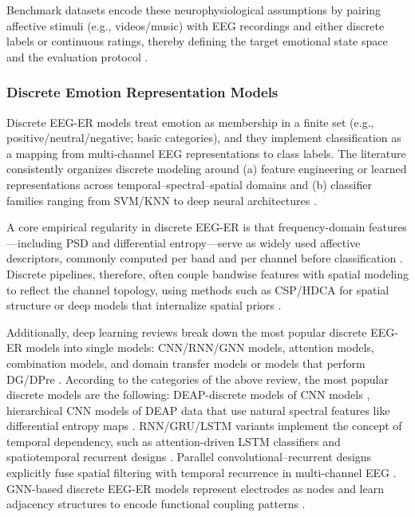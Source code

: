 \documentclass{WileyMSP-template}
\begin{document}
Benchmark datasets encode these neurophysiological assumptions by pairing affective stimuli (e.g., videos/music) with EEG recordings and either discrete labels or continuous ratings, thereby defining the target emotional state space and the evaluation protocol \cite{li2022transferreview}.

\subsubsection{Discrete Emotion Representation Models}
Discrete EEG-ER models treat emotion as membership in a finite set (e.g., positive/neutral/negative; basic categories), and they implement classification as a mapping from multi-channel EEG representations to class labels. The literature consistently organizes discrete modeling around (a) feature engineering or learned representations across temporal–spectral–spatial domains and (b) classifier families ranging from SVM/KNN to deep neural architectures \cite{wang2024researchprogress}.

A core empirical regularity in discrete EEG-ER is that frequency-domain features—including PSD and differential entropy—serve as widely used affective descriptors, commonly computed per band and per channel before classification \cite{ma2024peerjreview}. Discrete pipelines, therefore, often couple bandwise features with spatial modeling to reflect the channel topology, using methods such as CSP/HDCA for spatial structure or deep models that internalize spatial priors \cite{ma2024peerjreview}. 

Additionally, deep learning reviews break down the most popular discrete EEG-ER models into single models: CNN/RNN/GNN models, attention models, combination models, and domain transfer models or models that perform DG/DPre \cite{geng2025dlreview}. According to the categories of the above review, the most popular discrete models are the following: DEAP-discrete models of CNN models \cite{tripathi2017deapcnn}, hierarchical CNN models of DEAP data that use natural spectral features like differential entropy maps \cite{li2018hcnn}. RNN/GRU/LSTM variants implement the concept of temporal dependency, such as attention-driven LSTM classifiers and spatiotemporal recurrent designs \cite{kim2020lstmatt}. Parallel convolutional–recurrent designs explicitly fuse spatial filtering with temporal recurrence in multi-channel EEG \cite{yang2018pcrnn}. GNN-based discrete EEG-ER models represent electrodes as nodes and learn adjacency structures to encode functional coupling patterns \cite{zhong2020rgnn}.
\end{document}
